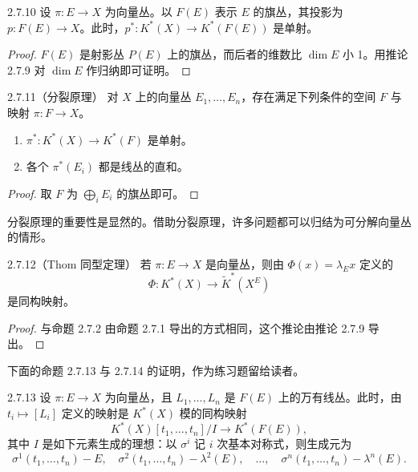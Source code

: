 \begin{corollary*}{2.7.10}
  设 $\pi\colon E\to X$ 为向量丛。以 $F(E)$ 表示 $E$ 的旗丛，其投影为 $p\colon F(E)\to X$。此时，$p^*\colon K^*(X)\to K^*(F(E))$ 是单射。
\end{corollary*}

\begin{proof}
  $F(E)$ 是射影丛 $P(E)$ 上的旗丛，而后者的维数比 $\dim E$ 小 1。用推论 2.7.9 对 $\dim E$ 作归纳即可证明。
\end{proof}

\begin{corollary*}{2.7.11}（分裂原理）
  对 $X$ 上的向量丛 $E_1,\ldots,E_n$，存在满足下列条件的空间 $F$ 与映射 $\pi\colon F\to X$。
  \begin{enumerate}[label=\arabic*),leftmargin=2.2em,itemsep=2pt]
  \item $\pi^*\colon K^*(X)\to K^*(F)$ 是单射。
  \item 各个 $\pi^*(E_i)$ 都是线丛的直和。
  \end{enumerate}
\end{corollary*}

\begin{proof}
  取 $F$ 为 $\bigoplus_i E_i$ 的旗丛即可。
\end{proof}

分裂原理的重要性是显然的。借助分裂原理，许多问题都可以归结为可分解向量丛的情形。

\begin{corollary*}{2.7.12}（Thom 同型定理）
  若 $\pi\colon E\to X$ 是向量丛，则由 $\Phi(x)=\lambda_E x$ 定义的
  \[
  \Phi\colon K^*(X)\longrightarrow\tilde K^*(X^E)
  \]
  是同构映射。
\end{corollary*}

\begin{proof}
  与命题 2.7.2 由命题 2.7.1 导出的方式相同，这个推论由推论 2.7.9 导出。
\end{proof}


下面的命题 2.7.13 与 2.7.14 的证明，作为练习题留给读者。

\begin{proposition*}{2.7.13}
  设 $\pi\colon E\to X$ 为向量丛，且 $L_1,\ldots,L_n$ 是 $F(E)$ 上的万有线丛。此时，由 $t_i\mapsto[L_i]$ 定义的映射是 $K^*(X)$ 模的同构映射
  \[
  K^*(X)[t_1,\ldots,t_n]/I\longrightarrow K^*(F(E)),
  \]
  其中 $I$ 是如下元素生成的理想：以 $\sigma^i$ 记 $i$ 次基本对称式，则生成元为
  \[
  \sigma^1(t_1,\ldots,t_n)-E,\quad
  \sigma^2(t_1,\ldots,t_n)-\lambda^2(E),\quad\ldots,\quad
  \sigma^n(t_1,\ldots,t_n)-\lambda^n(E).
  \]
\end{proposition*}

